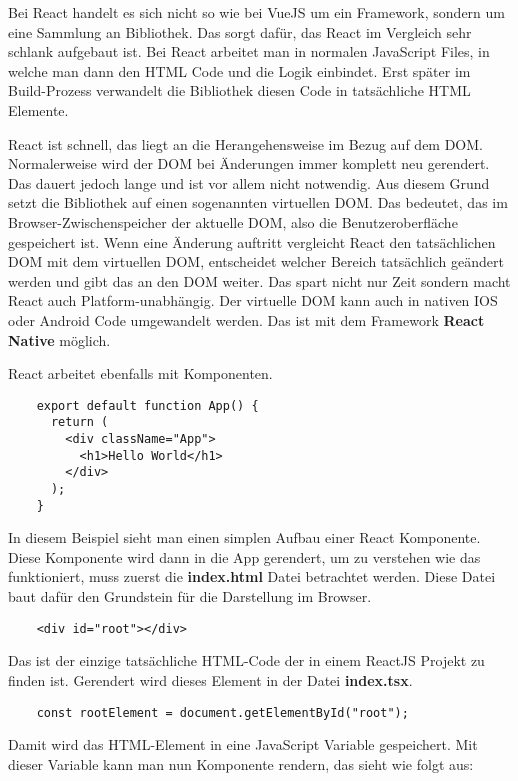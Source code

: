 Bei React handelt es sich nicht so wie bei VueJS um ein Framework, sondern um eine Sammlung an Bibliothek. Das sorgt dafür, das React im Vergleich sehr schlank aufgebaut ist. Bei React arbeitet man in normalen JavaScript Files, in welche man dann den HTML Code und die Logik einbindet. Erst später im Build-Prozess verwandelt die Bibliothek diesen Code in tatsächliche HTML Elemente. 

React ist schnell, das liegt an die Herangehensweise im Bezug auf dem DOM. Normalerweise wird der DOM bei Änderungen immer komplett neu gerendert. Das dauert jedoch lange und ist vor allem nicht notwendig. Aus diesem Grund setzt die Bibliothek auf einen sogenannten virtuellen DOM. Das bedeutet, das im Browser-Zwischenspeicher der aktuelle DOM, also die Benutzeroberfläche gespeichert ist. Wenn eine Änderung auftritt vergleicht React den tatsächlichen DOM mit dem virtuellen DOM, entscheidet welcher Bereich tatsächlich geändert werden und gibt das an den DOM weiter. Das spart nicht nur Zeit sondern macht React auch Platform-unabhängig. Der virtuelle DOM kann auch in nativen IOS oder Android Code umgewandelt werden. Das ist mit dem Framework \textbf{React Native} möglich.

React arbeitet ebenfalls mit Komponenten.

\begin{lstlisting}
    export default function App() {
      return (
        <div className="App">
          <h1>Hello World</h1>
        </div>
      );
    }
\end{lstlisting}

In diesem Beispiel sieht man einen simplen Aufbau einer React Komponente. Diese Komponente wird dann in die App gerendert, um zu verstehen wie das funktioniert, muss zuerst die \textbf{index.html} Datei betrachtet werden. Diese Datei baut dafür den Grundstein für die Darstellung im Browser.

\begin{lstlisting}
    <div id="root"></div>
\end{lstlisting}

Das ist der einzige tatsächliche HTML-Code der in einem ReactJS Projekt zu finden ist. Gerendert wird dieses Element in der Datei \textbf{index.tsx}.

\begin{lstlisting}
    const rootElement = document.getElementById("root");
\end{lstlisting}

Damit wird das HTML-Element in eine JavaScript Variable gespeichert. Mit dieser Variable kann man nun Komponente rendern, das sieht wie folgt aus:

